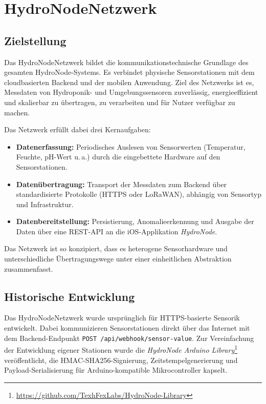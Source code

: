 \chapter{HydroNodeNetzwerk}

\section*{Zielstellung}

Das HydroNodeNetzwerk bildet die kommunikationstechnische Grundlage des gesamten HydroNode-Systems.
Es verbindet physische Sensorstationen mit dem cloudbasierten Backend und der mobilen Anwendung.
Ziel des Netzwerks ist es, Messdaten von Hydroponik- und Umgebungssensoren zuverlässig, energieeffizient
und skalierbar zu übertragen, zu verarbeiten und für Nutzer verfügbar zu machen.

Das Netzwerk erfüllt dabei drei Kernaufgaben:

\begin{itemize}
  \item \textbf{Datenerfassung:} Periodisches Auslesen von Sensorwerten (Temperatur, Feuchte, pH-Wert u.\,a.)
        durch die eingebettete Hardware auf den Sensorstationen.
  \item \textbf{Datenübertragung:} Transport der Messdaten zum Backend über standardisierte Protokolle
        (HTTPS oder LoRaWAN), abhängig von Sensortyp und Infrastruktur.
  \item \textbf{Datenbereitstellung:} Persistierung, Anomalieerkennung und Ausgabe der Daten über
        eine REST-API an die iOS-Applikation \textit{HydroNode}.
\end{itemize}

Das Netzwerk ist so konzipiert, dass es heterogene Sensorhardware und unterschiedliche
Übertragungswege unter einer einheitlichen Abstraktion zusammenfasst.

\section*{Historische Entwicklung}

Das HydroNodeNetzwerk wurde ursprünglich für HTTPS-basierte Sensorik entwickelt.
Dabei kommunizieren Sensorstationen direkt über das Internet mit dem Backend-Endpunkt
\texttt{POST /api/webhook/sensor-value}.
Zur Vereinfachung der Entwicklung eigener Stationen wurde die
\textit{HydroNode Arduino Library}\footnote{\url{https://github.com/TexhFexLabs/HydroNode-Library}}
veröffentlicht, die HMAC-SHA256-Signierung, Zeitstempelgenerierung und Payload-Serialisierung
für Arduino-kompatible Mikrocontroller kapselt.

